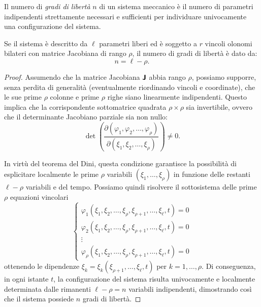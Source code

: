 \begin{definition}
Il numero di \emph{gradi di libertà} $n$ di un sistema meccanico è il numero di parametri indipendenti strettamente necessari e sufficienti per individuare univocamente una configurazione del sistema.
\end{definition}

\begin{proposition}\label{prop:gradoLiberta}
Se il sistema è descritto da $\ell$ parametri liberi ed è soggetto a $r$ vincoli olonomi bilateri con matrice Jacobiana di rango $\rho$, il numero di gradi di libertà è dato da:
\begin{equation*}
    n = \ell - \rho.
\end{equation*}
\end{proposition}

\begin{proof}
Assumendo che la matrice Jacobiana $\boldsymbol{\mathsf{J}}$ abbia rango $\rho$, possiamo supporre, senza perdita di generalità (eventualmente riordinando vincoli e coordinate), che le sue prime $\rho$ colonne e prime $\rho$ righe siano linearmente indipendenti. Questo implica che la corrispondente sottomatrice quadrata $\rho \times \rho$ sia invertibile, ovvero che il determinante Jacobiano parziale sia non nullo:
\begin{equation*}
    \det \left( \frac{\partial(\varphi_1, \varphi_2, \ldots, \varphi_\rho)}{\partial(\xi_1, \xi_2, \ldots, \xi_\rho)} \right) \neq 0.
\end{equation*}

In virtù del teorema del Dini, questa condizione garantisce la possibilità di esplicitare localmente le prime $\rho$ variabili $(\xi_1, \ldots, \xi_\rho)$ in funzione delle restanti $\ell - \rho$ variabili e del tempo. Possiamo quindi risolvere il sottosistema delle prime $\rho$ equazioni vincolari
\begin{equation*}
    \begin{cases} 
        \varphi_1(\xi_1, \xi_2, \ldots, \xi_\rho, \xi_{\rho+1}, \ldots, \xi_\ell, t) = 0 \\ 
        \varphi_2(\xi_1, \xi_2, \ldots, \xi_\rho, \xi_{\rho+1}, \ldots, \xi_\ell, t) = 0 \\ 
        \vdots \\ 
        \varphi_\rho(\xi_1, \xi_2, \ldots, \xi_\rho, \xi_{\rho+1}, \ldots, \xi_\ell, t) = 0 
    \end{cases}
\end{equation*}
ottenendo le dipendenze $\xi_k = \xi_k(\xi_{\rho+1}, \ldots, \xi_\ell, t)$ per $k = 1, \ldots, \rho$. Di conseguenza, in ogni istante $t$, la configurazione del sistema risulta univocamente e localmente determinata dalle rimanenti $\ell - \rho = n$ variabili indipendenti, dimostrando così che il sistema possiede $n$ gradi di libertà.
\end{proof}

